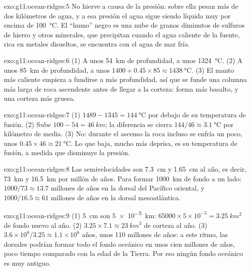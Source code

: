 \begin{solution}{exo:g11:ocean-ridges:5}
No hierve a causa de la presión: sobre ella pesan más de dos kilómetros de
agua, y a esa presión el agua sigue siendo líquida muy por encima de
\qty{100}{\celsius}. El ``humo'' negro es una nube de granos diminutos de
sulfuros de hierro y otros minerales, que precipitan cuando el agua caliente
de la fuente, rica en metales disueltos, se encuentra con el agua de mar fría.
\end{solution}

\begin{solution}{exo:g11:ocean-ridges:6}
(1) A unos \qty{54}{km} de profundidad, a unos \qty{1324}{\celsius}. (2) A
unos \qty{85}{km} de profundidad, a unos $1400 + 0.45 \times 85 \approx
\qty{1438}{\celsius}$. (3) El manto más caliente empieza a fundirse a más
profundidad, así que se funde una columna más larga de roca ascendente antes
de llegar a la corteza: forma más basalto, y una corteza más gruesa.
\end{solution}

\begin{solution}{exo:g11:ocean-ridges:7}
(1) $1489 - 1345 = \qty{144}{\celsius}$ por debajo de su temperatura de
fusión. (2) Sube $100 - 54 = \qty{46}{km}$; la diferencia se cierra
$144/46 \approx \qty{3.1}{\celsius}$ por kilómetro de media. (3) No: durante el
ascenso la roca incluso se enfría un poco, unos $0.45 \times 46 \approx
\qty{21}{\celsius}$. Lo que baja, mucho más deprisa, es su temperatura de
fusión, a medida que disminuye la presión.
\end{solution}

\begin{solution}{exo:g11:ocean-ridges:8}
Las semivelocidades son \qty{7.3}{cm} y \qty{1.65}{cm} al año, es decir,
\qty{73}{km} y \qty{16.5}{km} por millón de años. Para formar \qty{1000}{km}
de fondo a un lado: $1000/73 \approx 13.7$ millones de años en la dorsal del
Pacífico oriental, y $1000/16.5 \approx 61$ millones de años en la dorsal
mesoatlántica.
\end{solution}

\begin{solution}{exo:g11:ocean-ridges:9}
(1) \qty{5}{cm} son \qty{5e-5}{km}: $65000 \times 5 \times 10^{-5} =
\qty{3.25}{km^2}$ de fondo nuevo al año. (2) $3.25 \times 7.1 \approx
\qty{23}{km^3}$ de corteza al año. (3) $3.6 \times 10^8 / 3.25 \approx 1.1
\times 10^8$ años, unos 110 millones de años: a este ritmo, las dorsales
podrían formar todo el fondo oceánico en unos cien millones de años, poco
tiempo comparado con la edad de la Tierra. Por eso ningún fondo oceánico es
muy antiguo.
\end{solution}

